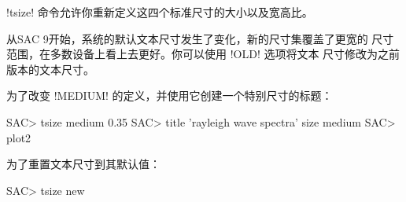 !tsize! 命令允许你重新定义这四个标准尺寸的大小以及宽高比。

从SAC 9开始，系统的默认文本尺寸发生了变化，新的尺寸集覆盖了更宽的
尺寸范围，在多数设备上看上去更好。你可以使用 !OLD! 选项将文本
尺寸修改为之前版本的文本尺寸。

为了改变 !MEDIUM! 的定义，并使用它创建一个特别尺寸的标题：
\begin{SACCode}
SAC> tsize medium 0.35
SAC> title 'rayleigh wave spectra' size medium
SAC> plot2
\end{SACCode}

为了重置文本尺寸到其默认值：
\begin{SACCode}
SAC> tsize new
\end{SACCode}
